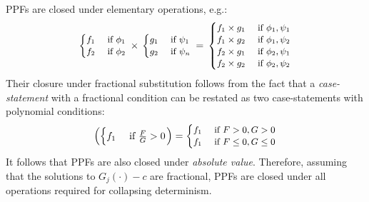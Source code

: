 \documentclass[]{article}
\newcommand{\case}[2]{#2 &\text{ if } #1}%
\begin{document}

PPFs are closed under elementary operations, e.g.:
\begin{equation*}
\footnotesize
  \begin{cases}
  \case{\phi_1}{f_1}\\
  \case{\phi_2}{f_2}    
  \end{cases}
\,
 \times
\,
  \begin{cases}
  \case{\psi_1}{g_1} \\
  \case{\psi_n}{g_2} 
  \end{cases}
 \, = \,
\begin{cases}
  \case{\phi_1, \psi_1}{f_1 \times g_1} \\ 
  \case{\phi_1, \psi_2}{f_1 \times g_2} \\
  \case{\phi_2, \psi_1}{f_2 \times g_1} \\
  \case{\phi_2, \psi_2}{f_2 \times g_2}
  \end{cases}
\end{equation*} 
Their closure under fractional substitution follows from the fact that 
a \emph{case-statement} with a fractional condition can be restated as two case-statements with polynomial conditions:
\begin{align*}
\left(
 \begin{cases}
  \case{\frac{F}{G} > 0}{f_1} \\ 
 \end{cases} 
\right)
 =
{\footnotesize
\begin{cases}
  \case{F > 0, G > 0 }{f_1} \\ 
  \case{F \leq 0, G \leq 0}{f_1} \\ 
 \end{cases} 
}
\end{align*}
It follows that PPFs are also closed under \emph{absolute value}.
Therefore, assuming that the solutions to $G_j(\cdot) - c$ are fractional,
PPFs are closed under all operations required for collapsing determinism. %

\end{document}
